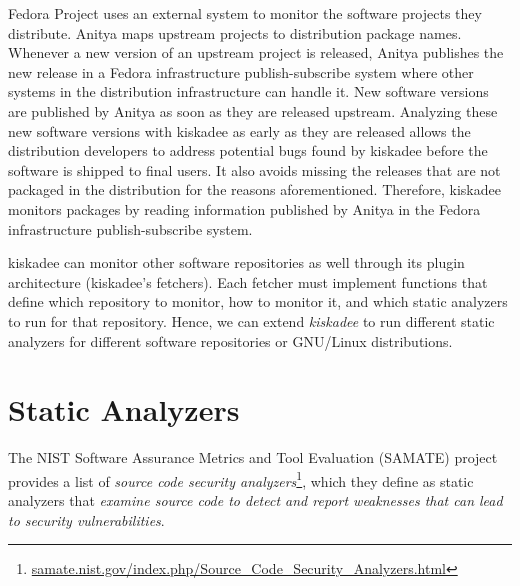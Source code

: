 Fedora Project uses an external system to monitor the software projects they
distribute. Anitya \cite{anitya} maps upstream projects to distribution package
names. Whenever a new version of an upstream project is released, Anitya
publishes the new release in a Fedora infrastructure publish-subscribe system
where other systems in the distribution infrastructure can handle it.  New
software versions are published by Anitya as soon as they are released
upstream. Analyzing these new software versions with kiskadee as early as they
are released allows the distribution developers to address potential bugs found
by kiskadee before the software is shipped to final users. It also avoids
missing the releases that are not packaged in the distribution for the reasons
aforementioned. Therefore, kiskadee monitors packages by reading information
published by Anitya in the Fedora infrastructure publish-subscribe system.

kiskadee can monitor other software repositories as well through its plugin
architecture (kiskadee's fetchers). Each fetcher must implement functions that
define which repository to monitor, how to monitor it, and which static
analyzers to run for that repository. Hence, we can extend \textit{kiskadee} to
run different static analyzers for different software repositories or GNU/Linux
distributions.

\section{Static Analyzers}

The NIST Software Assurance Metrics and Tool Evaluation (SAMATE) project
provides a list of \textit{source code security
analyzers}\footnote{\url{samate.nist.gov/index.php/Source_Code_Security_Analyzers.html}},
which they define as static analyzers that \textit{examine source code to
detect and report weaknesses that can lead to security vulnerabilities}.

